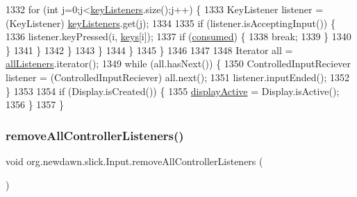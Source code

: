 \begin{DoxyCode}
1332                         \textcolor{keywordflow}{for} (\textcolor{keywordtype}{int} j=0;j<\mbox{\hyperlink{classorg_1_1newdawn_1_1slick_1_1_input_a9a68e6a9e9441fea9793f57603be2f96}{keyListeners}}.size();j++) \{
1333                             KeyListener listener = (KeyListener) \mbox{\hyperlink{classorg_1_1newdawn_1_1slick_1_1_input_a9a68e6a9e9441fea9793f57603be2f96}{keyListeners}}.get(j);
1334 
1335                             \textcolor{keywordflow}{if} (listener.isAcceptingInput()) \{
1336                                 listener.keyPressed(i, \mbox{\hyperlink{classorg_1_1newdawn_1_1slick_1_1_input_a2b4c556098d440654e51cae57d63e429}{keys}}[i]);
1337                                 \textcolor{keywordflow}{if} (\mbox{\hyperlink{classorg_1_1newdawn_1_1slick_1_1_input_af37be3b950898acb03ac33cca068cc9a}{consumed}}) \{
1338                                     \textcolor{keywordflow}{break};
1339                                 \}
1340                             \}
1341                         \}
1342                     \}
1343                 \}
1344             \}
1345         \}
1346 
1347         
1348         Iterator all = \mbox{\hyperlink{classorg_1_1newdawn_1_1slick_1_1_input_a26d5ed77d8b0444118d630336d0ab6d7}{allListeners}}.iterator();
1349         \textcolor{keywordflow}{while} (all.hasNext()) \{
1350             ControlledInputReciever listener = (ControlledInputReciever) all.next();
1351             listener.inputEnded();
1352         \}
1353         
1354         \textcolor{keywordflow}{if} (Display.isCreated()) \{
1355             \mbox{\hyperlink{classorg_1_1newdawn_1_1slick_1_1_input_a2bca09cd95bf97dace22ffc219cf08a9}{displayActive}} = Display.isActive();
1356         \}
1357     \}
\end{DoxyCode}
\mbox{\label{classorg_1_1newdawn_1_1slick_1_1_input_acb348bdf120c425b0f18baec184196ac}} 
\subsubsection{\texorpdfstring{remove\+All\+Controller\+Listeners()}{removeAllControllerListeners()}}
{\footnotesize\ttfamily void org.\+newdawn.\+slick.\+Input.\+remove\+All\+Controller\+Listeners (\begin{DoxyParamCaption}{ }\end{DoxyParamCaption})\hspace{0.3cm}{\ttfamily [inline]}}

